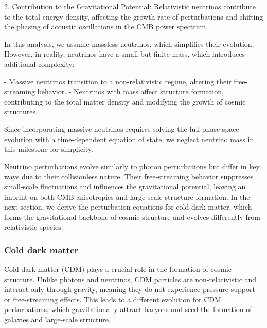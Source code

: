 \documentclass{aa}
\begin{document}
2. Contribution to the Gravitational Potential:  
   Relativistic neutrinos contribute to the total energy density, affecting the growth rate of perturbations and shifting the phasing of acoustic oscillations in the CMB power spectrum.

In this analysis, we assume massless neutrinos, which simplifies their evolution. However, in reality, neutrinos have a small but finite mass, which introduces additional complexity:

- Massive neutrinos transition to a non-relativistic regime, altering their free-streaming behavior.
- Neutrinos with mass affect structure formation, contributing to the total matter density and modifying the growth of cosmic structures.

Since incorporating massive neutrinos requires solving the full phase-space evolution with a time-dependent equation of state, we neglect neutrino mass in this milestone for simplicity. 

Neutrino perturbations evolve similarly to photon perturbations but differ in key ways due to their collisionless nature. Their free-streaming behavior suppresses small-scale fluctuations and influences the gravitational potential, leaving an imprint on both CMB anisotropies and large-scale structure formation. In the next section, we derive the perturbation equations for cold dark matter, which forms the gravitational backbone of cosmic structure and evolves differently from relativistic species.
\color{black}







\subsubsection{Cold dark matter}
\color{Plum}
Cold dark matter (CDM) plays a crucial role in the formation of cosmic structure. Unlike photons and neutrinos, CDM particles are non-relativistic and interact only through gravity, meaning they do not experience pressure support or free-streaming effects. This leads to a different evolution for CDM perturbations, which gravitationally attract baryons and seed the formation of galaxies and large-scale structure.
\end{document}
